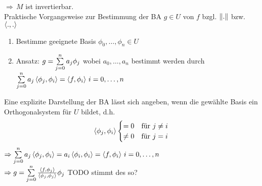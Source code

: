$\Rightarrow\,M$ ist invertierbar.\\
Praktische Vorgangsweise zur Bestimmung der BA $g \in U$ von $f$ bzgl. $\left\lVert . \right\rVert$ bzw. $\left\langle ., . \right\rangle$
\begin{enumerate}
  \item Bestimme geeignete Basis $\phi_0,\ldots,\phi_n \in U$
  \item Ansatz: $g = \sum\limits_{j=0}^{n}{a_j\phi_j}$ wobei $a_0,\ldots,a_n$ bestimmt werden durch 
    $\sum\limits_{j=0}^{n}{a_j\left\langle \phi_j, \phi_i \right\rangle} = \left\langle f, \phi_i \right\rangle\,i=0,\ldots,n$
\end{enumerate}
Eine explizite Darstellung der BA lässt sich angeben, wenn die gewählte Basis
ein Orthogonalsystem für $U$ bildet, d.h.
\begin{align*}
  \left\langle \phi_j, \phi_i \right\rangle \begin{cases}
    = 0 &\mbox{für } j \neq i\\
    \neq 0 &\mbox{für } j = i
  \end{cases}
\end{align*}
$\Rightarrow \sum\limits_{j=0}^{n}{a_j\left\langle \phi_j, \phi_i \right\rangle} = a_i \left\langle \phi_i, \phi_i \right\rangle = \left\langle f, \phi_i \right\rangle\,i=0,\ldots,n$\\
$\Rightarrow g = \sum\limits_{j=0}^{n}{\frac{\left\langle f, \phi_j \right\rangle}{\left\langle \phi_j, \phi_j \right\rangle} \phi_j}$ TODO stimmt des so?
